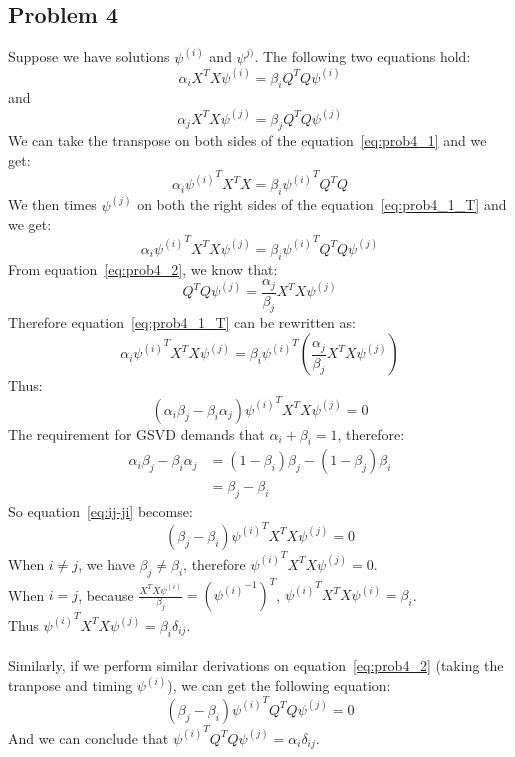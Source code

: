 \documentclass{article}
\begin{document}
\subsection*{Problem 4}
Suppose we have solutions $\psi^{(i)}$ and $\psi^{j)}$. The following two equations hold:
\begin{equation}
\label{eq:prob4_1}
\alpha_i X^T X \psi^{(i)} = \beta_i Q^T Q \psi^{(i)}
\end{equation}
and
\begin{equation}
\label{eq:prob4_2}
\alpha_j X^T X \psi^{(j)} = \beta_j Q^T Q \psi^{(j)}
\end{equation}
We can take the transpose on both sides of the equation~\ref{eq:prob4_1} and we get:
\begin{equation}
\label{eq:prob4_1_T}
\alpha_i {\psi^{(i)}}^T X^T X = \beta_i {\psi^{(i)}}^T Q^T Q
\end{equation}
We then times $\psi^{(j)}$ on both the right sides of the equation~\ref{eq:prob4_1_T} and we get:
\begin{equation}
\label{eq:prob4_1_T}
\alpha_i {\psi^{(i)}}^T X^T X \psi^{(j)}= \beta_i {\psi^{(i)}}^T Q^T Q \psi^{(j)}
\end{equation}
From equation~\ref{eq:prob4_2}, we know that:
\begin{equation}
Q^T Q \psi^{(j)} = \frac{\alpha_j}{\beta_j} X^T X \psi^{(j)}
\end{equation}
Therefore equation~\ref{eq:prob4_1_T} can be rewritten as:
\begin{equation}
\alpha_i {\psi^{(i)}}^T X^T X \psi^{(j)} = \beta_i {\psi^{(i)}}^T (\frac{\alpha_j}{\beta_j} X^T X \psi^{(j)})
\end{equation}
Thus:
\begin{equation}
\label{eq:ij-ji}
(\alpha_i \beta_j - \beta_i \alpha_j) {\psi^{(i)}}^T X^T X \psi^{(j)} = 0
\end{equation}
The requirement for GSVD demands that $\alpha_i + \beta_i = 1$, therefore:
\begin{align*}
 \alpha_i \beta_j - \beta_i \alpha_j &= (1 - \beta_i)\beta_j - (1-\beta_j)\beta_i\\
 &= \beta_j - \beta_i
\end{align*}
So equation~\ref{eq:ij-ji} becomse:
\begin{equation*}
(\beta_j - \beta_i){\psi^{(i)}}^T X^T X \psi^{(j)} = 0
\end{equation*}
When $i \neq j$, we have $\beta_j \neq \beta_i$, therefore ${\psi^{(i)}}^T X^T X \psi^{(j)} = 0$. \\
When $i = j$, because $\frac{X^T X \psi^{(i)}}{\beta_j} = {({\psi^{(i)}}^{-1})}^T$, ${\psi^{(i)}}^T X^T X \psi^{(i)} = \beta_i$. \\
Thus ${\psi^{(i)}}^T X^T X \psi^{(j)} = \beta_i \delta_{ij}$. \\
\\
Similarly, if we perform similar derivations on equation~\ref{eq:prob4_2} (taking the tranpose and timing $\psi^{(i)}$), we can get the following equation:
\begin{equation*}
(\beta_j - \beta_i){\psi^{(i)}}^T Q^T Q \psi^{(j)} = 0
\end{equation*}
And we can conclude that ${\psi^{(i)}}^T Q^TQ \psi^{(j)} = \alpha_i \delta_{ij}$.
\end{document}
